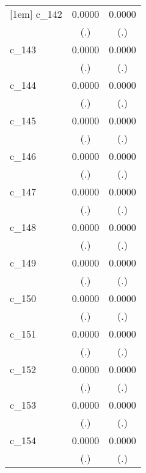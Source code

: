 {\begin{tabular}{l*{2}{c}}
[1em]
c\_142       &      0.0000        &      0.0000        \\
            &         (.)        &         (.)        \\
[1em]
c\_143       &      0.0000        &      0.0000        \\
            &         (.)        &         (.)        \\
[1em]
c\_144       &      0.0000        &      0.0000        \\
            &         (.)        &         (.)        \\
[1em]
c\_145       &      0.0000        &      0.0000        \\
            &         (.)        &         (.)        \\
[1em]
c\_146       &      0.0000        &      0.0000        \\
            &         (.)        &         (.)        \\
[1em]
c\_147       &      0.0000        &      0.0000        \\
            &         (.)        &         (.)        \\
[1em]
c\_148       &      0.0000        &      0.0000        \\
            &         (.)        &         (.)        \\
[1em]
c\_149       &      0.0000        &      0.0000        \\
            &         (.)        &         (.)        \\
[1em]
c\_150       &      0.0000        &      0.0000        \\
            &         (.)        &         (.)        \\
[1em]
c\_151       &      0.0000        &      0.0000        \\
            &         (.)        &         (.)        \\
[1em]
c\_152       &      0.0000        &      0.0000        \\
            &         (.)        &         (.)        \\
[1em]
c\_153       &      0.0000        &      0.0000        \\
            &         (.)        &         (.)        \\
[1em]
c\_154       &      0.0000        &      0.0000        \\
            &         (.)        &         (.)        \\

\end{tabular}}
